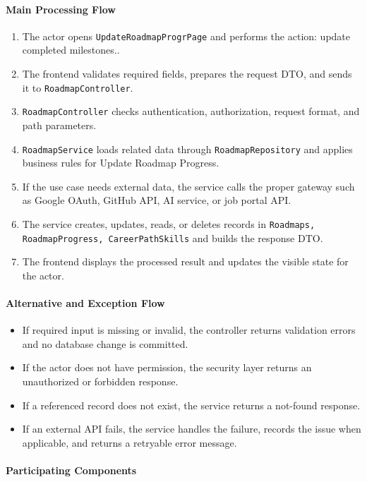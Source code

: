 \paragraph{Main Processing Flow}

\begin{enumerate}
    \item The actor opens \texttt{UpdateRoadmapProgrPage} and performs the action: update completed milestones..
    \item The frontend validates required fields, prepares the request DTO, and sends it to \texttt{RoadmapController}.
    \item \texttt{RoadmapController} checks authentication, authorization, request format, and path parameters.
    \item \texttt{RoadmapService} loads related data through \texttt{RoadmapRepository} and applies business rules for Update Roadmap Progress.
    \item If the use case needs external data, the service calls the proper gateway such as Google OAuth, GitHub API, AI service, or job portal API.
    \item The service creates, updates, reads, or deletes records in \texttt{Roadmaps, RoadmapProgress, CareerPathSkills} and builds the response DTO.
    \item The frontend displays the processed result and updates the visible state for the actor.
\end{enumerate}

\paragraph{Alternative and Exception Flow}

\begin{itemize}
    \item If required input is missing or invalid, the controller returns validation errors and no database change is committed.
    \item If the actor does not have permission, the security layer returns an unauthorized or forbidden response.
    \item If a referenced record does not exist, the service returns a not-found response.
    \item If an external API fails, the service handles the failure, records the issue when applicable, and returns a retryable error message.
\end{itemize}

\paragraph{Participating Components}

